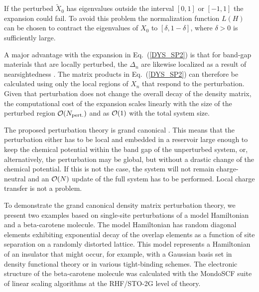 \documentclass[prl,aps,twocolumn,showpacs,twocolumngrid,superbib]{revtex4}
\begin{document}
If the perturbed ${\widetilde X}_0$ has eigenvalues outside
the interval $[0,1]$ or $[-1,1]$ the expansion could fail. To avoid this
problem the normalization function $L(H)$ can be chosen to contract the
eigenvalues of $X_0$ to $[\delta,1-\delta]$, where $\delta>0$ is sufficiently large.

A major advantage with the expansion in Eq.\ (\ref{DYS_SP2}) is that for band-gap 
materials that are locally perturbed, the $\Delta_n$ are likewise localized as a result 
of nearsightedness \cite{Kohn59,Kohn96}. The matrix products in Eq.\ (\ref{DYS_SP2}) 
can therefore be calculated using only the local regions of $X_n$ that respond to the perturbation.
Given that perturbation does not change the overall decay of the
density matrix, the computational cost of the expansion scales linearly with the
size of the perturbed region ${\cal O}(N_{\rm pert.})$ and as ${\cal O}(1)$ with
the total system size.

The proposed perturbation theory is grand canonical \cite{CPRT}. This means that 
the perturbation either has to be local and embedded in a reservoir large enough to
keep the chemical potential within the band gap of the unperturbed system, or,
alternatively, the perturbation may be global, but without a drastic
change of the chemical potential. If this is not the case, the system will 
not remain charge-neutral and an ${\cal O}(N)$ update of the full system has 
to be performed.  Local charge transfer is not a problem.

To demonstrate the grand canonical density matrix
perturbation theory, we present two examples based on single-site 
perturbations of a model Hamiltonian and a beta-carotene molecule.
The model Hamiltonian has random
diagonal elements exhibiting exponential decay of the overlap elements 
as a function of site separation on a randomly distorted 
lattice. This model represents a Hamiltonian of an insulator
that might occur, for example, with a Gaussian basis set in 
density functional theory or in various tight-binding schemes. 
The electronic structure of the beta-carotene molecule was calculated 
with the MondoSCF suite of linear scaling algorithms \cite{Mondo_SCF} 
at the RHF/STO-2G level of theory.
\end{document}
